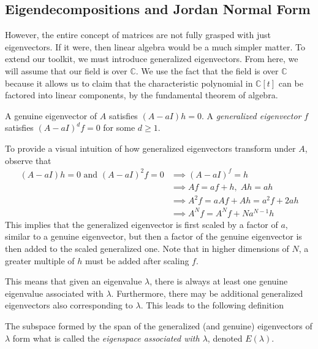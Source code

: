\documentclass{article}
\begin{document}
  \subsection{Eigendecompositions and Jordan Normal Form}

    However, the entire concept of matrices are not fully grasped with just eigenvectors. If it were, then linear algebra would be a much simpler matter. To extend our toolkit, we must introduce generalized eigenvectors. From here, we will assume that our field is over $\mathbb{C}$. We use the fact that the field is over $\mathbb{C}$ because it allows us to claim that the characteristic polynomial in $\mathbb{C}[t]$ can be factored into linear components, by the fundamental theorem of algebra. 

    \begin{definition}
    A genuine eigenvector of $A$ satisfies $(A-aI)h = 0$. A \textit{generalized eigenvector} $f$ satisfies $(A-a I)^{d} f = 0$ for some $d \geq 1$. 
    \end{definition}

    To provide a visual intuition of how generalized eigenvectors transform under $A$, observe that 
    \begin{align}
        (A - aI) h = 0 \text{ and } (A - aI)^2 f = 0 & \implies (A - aI)^f = h \\
        & \implies A f = a f + h, \; Ah = ah \\
        & \implies A^2 f = a A f + A h = a^2 f + 2 a h \\
        & \implies A^N f = A^N f + N a^{N-1} h 
    \end{align}
    This implies that the generalized eigenvector is first scaled by a factor of $a$, similar to a genuine eigenvector, but then a factor of the genuine eigenvector is then added to the scaled generalized one. Note that in higher dimensions of $N$, a greater multiple of $h$ must be added after scaling $f$. 

    This means that given an eigenvalue $\lambda$, there is always at least one genuine eigenvalue associated with $\lambda$. Furthermore, there may be additional generalized eigenvectors also corresponding to $\lambda$. This leads to the following definition

    \begin{definition}
    The subspace formed by the span of the generalized (and genuine) eigenvectors of $\lambda$ form what is called the \textit{eigenspace associated with $\lambda$}, denoted $E(\lambda)$. 
    \end{definition}
\end{document}
